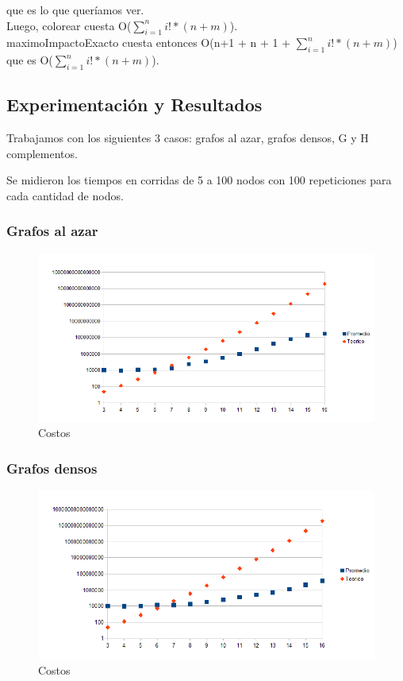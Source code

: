 \indent que es lo que queríamos ver.\\

\indent Luego, colorear cuesta O($\sum_{i=1}^{n} i! * (n+m) $).\\

\indent maximoImpactoExacto cuesta entonces O(n+1 + n + 1 + $\sum_{i=1}^{n} i! * (n+m) $) que es O($\sum_{i=1}^{n} i! * (n+m) $).\\

\subsection{Experimentación y Resultados}
\quad Trabajamos con los siguientes 3 casos: grafos al azar, grafos densos, G y H complementos.

\quad Se midieron los tiempos en corridas de  5 a 100 nodos con 100 repeticiones para cada cantidad de nodos.

\subsubsection{Grafos al azar}

\begin{figure}[H]
	\centering
	\includegraphics[scale=0.8]{exacto-tiempos-Azar.png}
\caption{Costos}
\end{figure}

\subsubsection{Grafos densos}

\begin{figure}[H]
	\centering
	\includegraphics[scale=0.8]{exacto-tiempos-G-y-H-densos.png}
\caption{Costos}
\end{figure}

